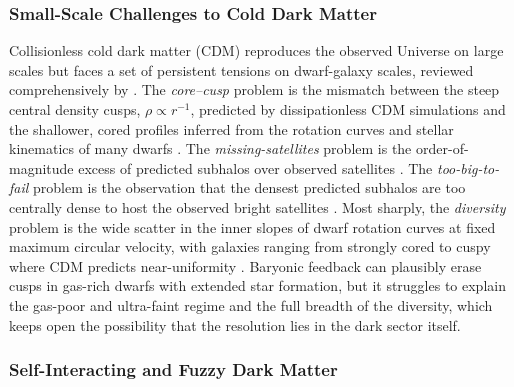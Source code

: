 \documentclass[10pt,onecolumn]{article}
\begin{document}
\subsubsection{Small-Scale Challenges to Cold Dark Matter}

Collisionless cold dark matter (CDM) reproduces the observed Universe on large scales but faces a set of persistent tensions on dwarf-galaxy scales, reviewed comprehensively by \cite{bullock2017}. The \emph{core--cusp} problem is the mismatch between the steep central density cusps, $\rho\propto r^{-1}$, predicted by dissipationless CDM simulations and the shallower, cored profiles inferred from the rotation curves and stellar kinematics of many dwarfs \cite{deblok2010}. The \emph{missing-satellites} problem is the order-of-magnitude excess of predicted subhalos over observed satellites \cite{moore1999}. The \emph{too-big-to-fail} problem is the observation that the densest predicted subhalos are too centrally dense to host the observed bright satellites \cite{boylankolchin2011}. Most sharply, the \emph{diversity} problem is the wide scatter in the inner slopes of dwarf rotation curves at fixed maximum circular velocity, with galaxies ranging from strongly cored to cuspy where CDM predicts near-uniformity \cite{oman2015}. Baryonic feedback can plausibly erase cusps in gas-rich dwarfs with extended star formation, but it struggles to explain the gas-poor and ultra-faint regime and the full breadth of the diversity, which keeps open the possibility that the resolution lies in the dark sector itself.

\subsubsection{Self-Interacting and Fuzzy Dark Matter}
\end{document}

